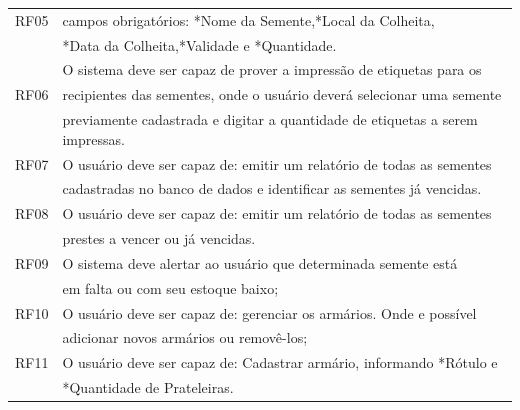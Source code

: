 \documentclass[12pt,a4paper]{article}
\begin{document}
\begin{table}[H]
\begin{tabular}{c|l}
RF05	& campos obrigatórios: *Nome da Semente,*Local da Colheita,\\
		& *Data da Colheita,*Validade e *Quantidade. 									\\ 
\hline%
		& O sistema deve ser capaz de prover a impressão de etiquetas para os \\
RF06 	&recipientes das sementes, onde o usuário deverá selecionar uma semente\\
		&previamente cadastrada e digitar a quantidade de etiquetas a serem impressas.\\  
\hline%
RF07 	& O usuário deve ser capaz de: emitir um relatório de todas as sementes\\ 
		& cadastradas no banco de dados e identificar as sementes já vencidas.										\\ 
\hline%
RF08 	& O usuário deve ser capaz de: emitir um relatório de todas as sementes\\ 
		& prestes a vencer ou já vencidas.\\ 
\hline%
RF09 	& O sistema deve alertar ao usuário que determinada semente está \\
		&em falta ou com seu estoque baixo;	\\
\hline%
RF10 	& O usuário deve ser capaz de: gerenciar os armários. Onde e possível  \\
		& adicionar novos armários ou removê-los;\\
\hline%
RF11 	& O usuário deve ser capaz de: Cadastrar armário, informando  *Rótulo e\\
		&*Quantidade de Prateleiras.	\\
\hline%

\end{tabular} 
\end{table} 
\end{document}

